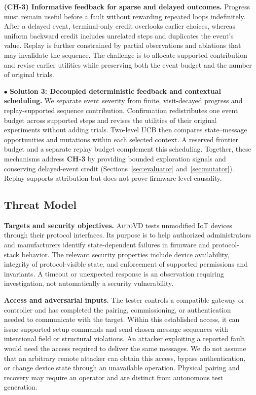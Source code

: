 \documentclass[10pt,journal,compsoc]{IEEEtran}
\newcommand{\system}{\textsc{AutoVD}}
\newcommand{\parab}[1]{\vspace{0.04in}\noindent\textbf{#1}}
\begin{document}
\noindent \textbf{(CH-3) Informative feedback for sparse and delayed outcomes.}
Progress must remain useful before a fault without rewarding repeated loops indefinitely. After a delayed event, terminal-only credit overlooks earlier choices, whereas uniform backward credit includes unrelated steps and duplicates the event's value. Replay is further constrained by partial observations and ablations that may invalidate the sequence. The challenge is to allocate supported contribution and revise earlier utilities while preserving both the event budget and the number of original trials.

\noindent $\bullet$ \textbf{Solution 3: Decoupled deterministic feedback and contextual scheduling.}
We separate event severity from finite, visit-decayed progress and replay-supported sequence contribution. Confirmation redistributes one event budget across supported steps and revises the utilities of their original experiments without adding trials. Two-level UCB then compares state--message opportunities and mutations within each selected context. A reserved frontier budget and a separate replay budget complement this scheduling. Together, these mechanisms address \textbf{CH-3} by providing bounded exploration signals and conserving delayed-event credit (Sections~\ref{sec:evaluator} and~\ref{sec:mutator}). Replay supports attribution but does not prove firmware-level causality.

\subsection{Threat Model}\label{sec:threat-model}
\parab{Targets and security objectives.}
\system{} tests unmodified IoT devices through their protocol interfaces. Its purpose is to help authorized administrators and manufacturers identify state-dependent failures in firmware and protocol-stack behavior. The relevant security properties include device availability, integrity of protocol-visible state, and enforcement of supported permissions and invariants. A timeout or unexpected response is an observation requiring investigation, not automatically a security vulnerability.

\parab{Access and adversarial inputs.}
The tester controls a compatible gateway or controller and has completed the pairing, commissioning, or authentication needed to communicate with the target. Within this established access, it can issue supported setup commands and send chosen message sequences with intentional field or structural violations. An attacker exploiting a reported fault would need the access required to deliver the same messages. We do not assume that an arbitrary remote attacker can obtain this access, bypass authentication, or change device state through an unavailable operation. Physical pairing and recovery may require an operator and are distinct from autonomous test generation.
\end{document}
